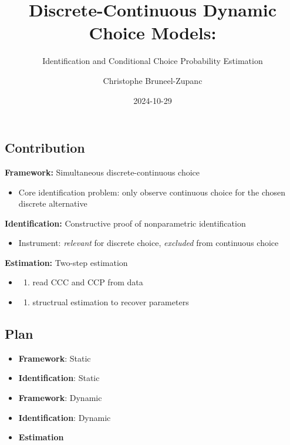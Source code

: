 \documentclass[
  letterpaper,
  DIV=11,
  numbers=noendperiod]{scrartcl}
\title{Discrete-Continuous Dynamic Choice Models:}
\subtitle{Identification and Conditional Choice Probability Estimation}
\author{Christophe Bruneel-Zupanc}
\date{2024-10-29}
\providecommand{\tightlist}{%
  \setlength{\itemsep}{0pt}\setlength{\parskip}{0pt}}\usepackage{longtable,booktabs,array}
\begin{document}
\maketitle


\subsection{Contribution}\label{contribution}

\textbf{Framework:} Simultaneous discrete-continuous choice

\begin{itemize}
\tightlist
\item
  Core identification problem: only observe continuous choice for the
  chosen discrete alternative
\end{itemize}

\textbf{Identification:} Constructive proof of nonparametric
identification

\begin{itemize}
\tightlist
\item
  Instrument: \emph{relevant} for discrete choice, \emph{excluded} from
  continuous choice
\end{itemize}

\textbf{Estimation:} Two-step estimation

\begin{itemize}
\tightlist
\item
  \begin{enumerate}
  \def\labelenumi{\arabic{enumi})}
  \tightlist
  \item
    read CCC and CCP from data\\
  \end{enumerate}
\item
  \begin{enumerate}
  \def\labelenumi{\arabic{enumi})}
  \setcounter{enumi}{1}
  \tightlist
  \item
    structrual estimation to recover parameters
  \end{enumerate}
\end{itemize}

\subsection{Plan}\label{plan}

\begin{itemize}
\tightlist
\item
  \textbf{Framework}: Static
\item
  \textbf{Identification}: Static
\item
  \textbf{Framework}: Dynamic
\item
  \textbf{Identification}: Dynamic
\item
  \textbf{Estimation}
\end{itemize}
\end{document}
